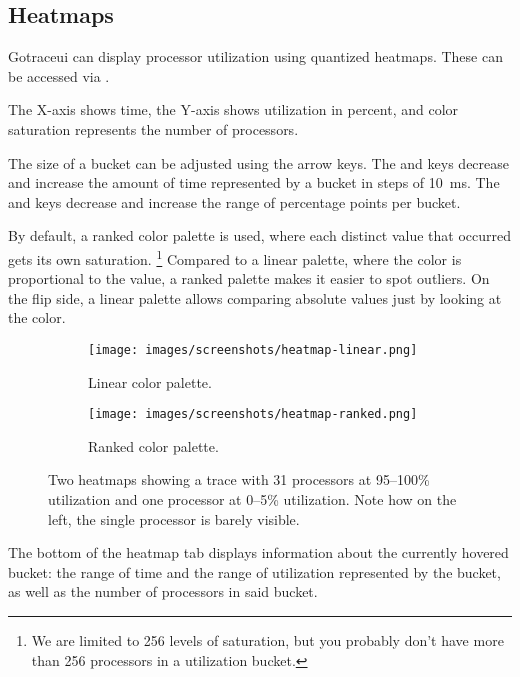 \documentclass[10pt,letterpaper,oneside,openany,english]{memoir}
\begin{document}
\subsection{Heatmaps}

Gotraceui can display processor utilization using quantized heatmaps.
These can be accessed via .

The X-axis shows time, the Y-axis shows utilization in percent, and color saturation represents the number of processors.

The size of a bucket can be adjusted using the arrow keys. The \keys{\arrowkey{<}} and \keys{\arrowkey{>}} keys decrease and increase the amount of time represented by a bucket in steps of \qty{10}{\milli\second}.
The  and \keys{\arrowkey{^}} keys decrease and increase the range of percentage points per bucket.

By default, a ranked color palette is used, where each distinct value that occurred gets its own saturation.%
\footnote{We are limited to 256 levels of saturation, but you probably don't have more than 256 processors in a utilization bucket.}
Compared to a linear palette, where the color is proportional to the value, a ranked palette makes it easier to spot outliers.
On the flip side, a linear palette allows comparing absolute values just by looking at the color.

\begin{figure}[h]
  \centering
  \begin{subfigure}[b]{0.49\textwidth}
    \centering
    \texttt{[image: images/screenshots/heatmap-linear.png]}
    \caption{Linear color palette.}
  \end{subfigure}
  \hfill
  \begin{subfigure}[b]{0.49\textwidth}
    \centering
    \texttt{[image: images/screenshots/heatmap-ranked.png]}
    \caption{Ranked color palette.}
  \end{subfigure}

  \caption{Two heatmaps showing a trace with 31 processors at 95--100\% utilization and one processor at 0--5\% utilization. Note how on the left, the single processor is barely visible.}
\end{figure}

The bottom of the heatmap tab displays information about the currently hovered bucket:
the range of time and the range of utilization represented by the bucket, as well as the number of processors in said bucket.
\end{document}
